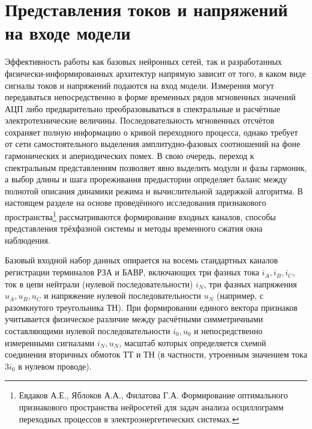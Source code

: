 \section{Представления токов и напряжений на входе модели}
\label{sec:ch4_signal_representations}

Эффективность работы как базовых нейронных сетей, так и разработанных
физически-информированных архитектур напрямую зависит от того, в каком
виде сигналы токов и напряжений подаются на вход модели. Измерения могут
передаваться непосредственно в форме временных рядов мгновенных значений
АЦП либо предварительно преобразовываться в спектральные и расчётные
электротехнические величины. Последовательность мгновенных отсчётов
сохраняет полную информацию о кривой переходного процесса, однако требует
от сети самостоятельного выделения амплитудно-фазовых соотношений на фоне
гармонических и апериодических помех. В свою очередь, переход к
спектральным представлениям позволяет явно выделить модули и фазы
гармоник, а выбор длины и шага прореживания предыстории определяет баланс
между полнотой описания динамики режима и вычислительной задержкой
алгоритма. В настоящем разделе на основе проведённого исследования
признакового пространства\footnote{Евдаков А.Е., Яблоков А.А., Филатова
Г.А. Формирование оптимального признакового пространства нейросетей для
задач анализа осциллограмм переходных процессов в электроэнергетических
системах.} рассматриваются формирование входных каналов, способы
представления трёхфазной системы и методы временного сжатия окна
наблюдения.

Базовый входной набор данных опирается на восемь стандартных каналов
регистрации терминалов РЗА и БАВР, включающих три фазных тока $i_A, i_B,
i_C$, ток в цепи нейтрали (нулевой последовательности) $i_N$, три фазных
напряжения $u_A, u_B, u_C$ и напряжение нулевой последовательности $u_N$
(например, с разомкнутого треугольника ТН). При формировании единого
вектора признаков учитывается физическое различие между расчётными
симметричными составляющими нулевой последовательности $i_0, u_0$ и
непосредственно измеренными сигналами $i_N, u_N$, масштаб которых
определяется схемой соединения вторичных обмоток ТТ и ТН (в частности,
утроенным значением тока $3i_0$ в нулевом проводе).

